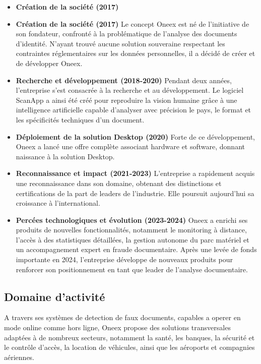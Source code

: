 \begin{itemize}
	\item \textbf{Création de la société (2017)}
	\item \textbf{Création de la société (2017)}
	      Le concept Oneex est né de l’initiative de son fondateur, confronté à la problématique de l’analyse des documents d’identité. N’ayant trouvé aucune solution souveraine respectant les contraintes réglementaires sur les données personnelles, il a décidé de créer et de développer Oneex.

	\item \textbf{Recherche et développement (2018-2020)}
	      Pendant deux années, l’entreprise s’est consacrée à la recherche et au développement. Le logiciel ScanApp a ainsi été créé pour reproduire la vision humaine grâce à une intelligence artificielle capable d’analyser avec précision le pays, le format et les spécificités techniques d’un document.

	\item \textbf{Déploiement de la solution Desktop (2020)}
	      Forte de ce développement, Oneex a lancé une offre complète associant hardware et software, donnant naissance à la solution Desktop.

	\item \textbf{Reconnaissance et impact (2021-2023)}
	      L’entreprise a rapidement acquis une reconnaissance dans son domaine, obtenant des distinctions et certifications de la part de leaders de l’industrie. Elle poursuit aujourd’hui sa croissance à l’international.

	\item \textbf{Percées technologiques et évolution (2023-2024)}
	      Oneex a enrichi ses produits de nouvelles fonctionnalités, notamment le monitoring à distance, l’accès à des statistiques détaillées, la gestion autonome du parc matériel et un accompagnement expert en fraude documentaire. Après une levée de fonds importante en 2024, l’entreprise développe de nouveaux produits pour renforcer son positionnement en tant que leader de l’analyse documentaire.
\end{itemize}

\subsection{Domaine d'activité}

A travers ses systèmes de detection de faux documents, capables a operer en mode online comme hors ligne, Oneex propose des solutions transversales adaptées à de nombreux secteurs, notamment la santé, les banques, la sécurité et le contrôle d’accès, la location de véhicules, ainsi que les aéroports et compagnies aériennes.

